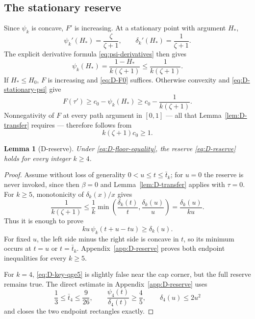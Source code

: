 \documentclass[11pt]{article}
\newtheorem{lemma}[theorem]{Lemma}
\theoremstyle{definition}
\theoremstyle{remark}
\begin{document}
\subsection{The stationary reserve}

Since $\psi_k$ is concave, $F'$ is increasing.  At a stationary point with
argument $H_*$,
\[
 \psi_k'(H_*)=\frac \zeta{\zeta+1},\qquad
 \delta_k'(H_*)=\frac1{\zeta+1}.
\]
The explicit derivative formula \eqref{eq:psi-derivatives} then gives
\begin{equation}\label{eq:D-stationary-psi}
 \psi_k(H_*)=\frac{1-H_*}{k(\zeta+1)}\le\frac1{k(\zeta+1)}.
\end{equation}
If $H_*\le H_0$, $F$ is increasing and \eqref{eq:D-F0} suffices.
Otherwise convexity and \eqref{eq:D-stationary-psi} give
\[
 F(\tau')\ge c_0-\psi_k(H_*)
 \ge c_0-\frac1{k(\zeta+1)}.
\]
Nonnegativity of $F$ at every path argument in $[0,1]$ --- all that
Lemma~\ref{lem:D-transfer} requires --- therefore follows from
\begin{equation}\label{eq:D-reserve}
 k(\zeta+1)c_0\ge1.
\end{equation}

\begin{lemma}[D-reserve]\label{lem:D-reserve}
Under \eqref{eq:D-floor-equality}, the reserve
\eqref{eq:D-reserve} holds for every integer $k\ge4$.
\end{lemma}

\begin{proof}
Assume without loss of generality $0<u\le t\le\bar t_k$; for $u=0$ the
reserve is never invoked, since then $\beta=0$ and
Lemma~\ref{lem:D-transfer} applies with $\tau=0$.
For $k\ge5$, monotonicity of $\delta_k(x)/x$ gives
\[
 \frac1{k(\zeta+1)}\le
 \frac1k\min\left(\frac{\delta_k(t)}t,
                    \frac{\delta_k(u)}u\right)
 =\frac{\delta_k(u)}{ku}.
\]
Thus it is enough to prove
\begin{equation}\label{eq:D-key-qge5}
 ku\,\psi_k(t+u-tu)\ge\delta_k(u).
\end{equation}
For fixed $u$, the left side minus the right side is concave in $t$, so its
minimum occurs at $t=u$ or $t=\bar t_k$.  Appendix~\ref{app:D-reserve}
proves both endpoint inequalities for every $k\ge5$.

For $k=4$, \eqref{eq:D-key-qge5} is slightly false near the cap corner, but
the full reserve remains true.  The direct estimate in
Appendix~\ref{app:D-reserve} uses
\[
 \frac13\le\bar t_4\le\frac9{26},\qquad
 \frac{\psi_4(t)}{\delta_4(t)}\ge\frac45,\qquad
 \delta_4(u)\le2u^2
\]
and closes the two endpoint rectangles exactly.
\end{proof}
\end{document}
